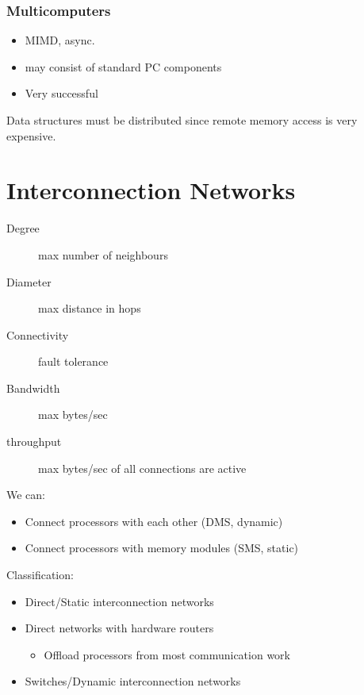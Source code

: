 \documentclass[a4paper]{article}
\begin{document}
\subsubsection{Multicomputers}
\begin{itemize}
    \item MIMD, async.
    \item may consist of standard PC components
    \item Very successful
\end{itemize}
Data structures must be distributed since remote memory access is very expensive.

\section{Interconnection Networks}
\begin{description}
    \item[Degree] max number of neighbours
    \item[Diameter] max distance in hops
    \item[Connectivity] fault tolerance
    \item[Bandwidth] max bytes/sec
    \item[throughput] max bytes/sec of all connections are active
\end{description}
We can:
\begin{itemize}
    \item Connect processors with each other (DMS, dynamic)
    \item Connect processors with memory modules (SMS, static)
\end{itemize}

Classification:
\begin{itemize}
    \item Direct/Static interconnection networks
    \item Direct networks with hardware routers
        \begin{itemize}
            \item Offload processors from most communication work
        \end{itemize}
    \item Switches/Dynamic interconnection networks
\end{itemize}
\end{document}

